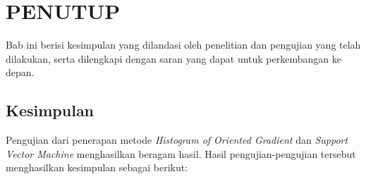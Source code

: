 \chapter{PENUTUP}

%
\vspace{4.5pt}
\noindent Bab ini berisi kesimpulan yang dilandasi oleh penelitian dan pengujian yang telah dilakukan, serta dilengkapi dengan saran yang dapat untuk perkembangan ke depan.\\

\section{Kesimpulan}
\noindent Pengujian dari penerapan metode \textit{Histogram of Oriented Gradient} dan \textit{Support Vector Machine} menghasilkan beragam hasil. Hasil pengujian-pengujian tersebut menghasilkan kesimpulan sebagai berikut:
